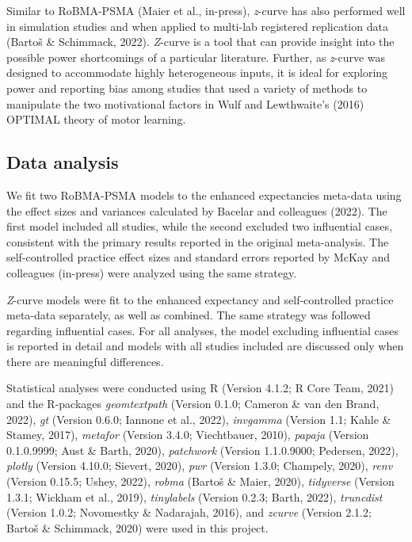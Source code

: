 \documentclass[
  man, donotrepeattitle,floatsintext]{apa7}
\begin{document}
Similar to RoBMA-PSMA (Maier et al., in-press), \emph{z}-curve has also performed well in simulation studies and when applied to multi-lab registered replication data (Bartoš \& Schimmack, 2022). \emph{Z}-curve is a tool that can provide insight into the possible power shortcomings of a particular literature. Further, as \emph{z}-curve was designed to accommodate highly heterogeneous inputs, it is ideal for exploring power and reporting bias among studies that used a variety of methods to manipulate the two motivational factors in Wulf and Lewthwaite's (2016) OPTIMAL theory of motor learning.

\hypertarget{data-analysis}{%
\subsection{Data analysis}\label{data-analysis}}

We fit two RoBMA-PSMA models to the enhanced expectancies meta-data using the effect sizes and variances calculated by Bacelar and colleagues (2022). The first model included all studies, while the second excluded two influential cases, consistent with the primary results reported in the original meta-analysis. The self-controlled practice effect sizes and standard errors reported by McKay and colleagues (in-press) were analyzed using the same strategy.

\emph{Z}-curve models were fit to the enhanced expectancy and self-controlled practice meta-data separately, as well as combined. The same strategy was followed regarding influential cases. For all analyses, the model excluding influential cases is reported in detail and models with all studies included are discussed only when there are meaningful differences.

Statistical analyses were conducted using R (Version 4.1.2; R Core Team, 2021) and the R-packages \emph{geomtextpath} (Version 0.1.0; Cameron \& van den Brand, 2022), \emph{gt} (Version 0.6.0; Iannone et al., 2022), \emph{invgamma} (Version 1.1; Kahle \& Stamey, 2017), \emph{metafor} (Version 3.4.0; Viechtbauer, 2010), \emph{papaja} (Version 0.1.0.9999; Aust \& Barth, 2020), \emph{patchwork} (Version 1.1.0.9000; Pedersen, 2022), \emph{plotly} (Version 4.10.0; Sievert, 2020), \emph{pwr} (Version 1.3.0; Champely, 2020), \emph{renv} (Version 0.15.5; Ushey, 2022), \emph{robma} (Bartoš \& Maier, 2020), \emph{tidyverse} (Version 1.3.1; Wickham et al., 2019), \emph{tinylabels} (Version 0.2.3; Barth, 2022), \emph{truncdist} (Version 1.0.2; Novomestky \& Nadarajah, 2016), and \emph{zcurve} (Version 2.1.2; Bartoš \& Schimmack, 2020) were used in this project.
\end{document}
